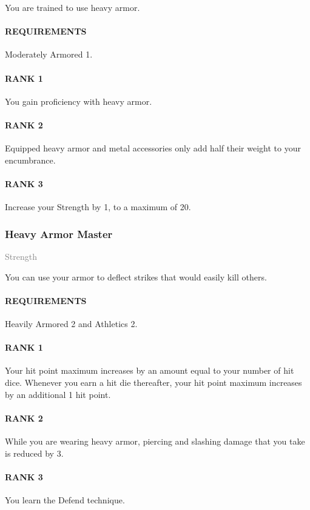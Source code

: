\normalsize
You are trained to use heavy armor.
\paragraph{REQUIREMENTS} Moderately Armored 1.
\paragraph{RANK 1} You gain proficiency with heavy armor.
\paragraph{RANK 2} Equipped heavy armor and metal accessories only add half their weight to your encumbrance.
\paragraph{RANK 3} Increase your Strength by 1, to a maximum of 20.

\subsubsection{Heavy Armor Master} \label{feat::heavyarmormaster}
\small{\textcolor{gray}{Strength}}

\normalsize
You can use your armor to deflect strikes that would easily kill others.
\paragraph{REQUIREMENTS} Heavily Armored 2 and Athletics 2.
\paragraph{RANK 1} Your hit point maximum increases by an amount equal to your number of hit dice.
Whenever you earn a hit die thereafter, your hit point maximum increases by an additional 1 hit point.
\paragraph{RANK 2} While you are wearing heavy armor, piercing and slashing damage that you take is reduced by 3.
\paragraph{RANK 3} You learn the Defend technique.

